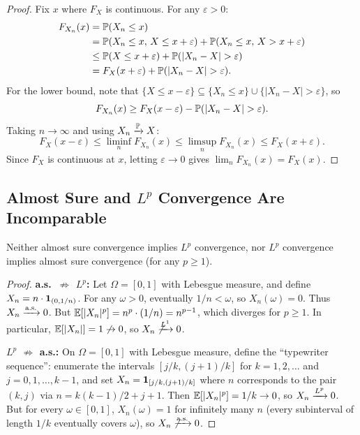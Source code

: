\documentclass[11pt,a4paper]{article}
\begin{document}
\begin{proof}
Fix $x$ where $F_X$ is continuous.  For any $\varepsilon > 0$:
\begin{align}
  F_{X_n}(x) &= \mathbb{P}(X_n \leq x) \nonumber\\
  &= \mathbb{P}(X_n \leq x,\, X \leq x + \varepsilon)
    + \mathbb{P}(X_n \leq x,\, X > x + \varepsilon) \nonumber\\
  &\leq \mathbb{P}(X \leq x + \varepsilon)
    + \mathbb{P}(|X_n - X| > \varepsilon) \nonumber\\
  &= F_X(x + \varepsilon) + \mathbb{P}(|X_n - X| > \varepsilon).
  \label{eq:prob_to_dist_upper}
\end{align}
For the lower bound, note that $\{X \leq x - \varepsilon\}
\subseteq \{X_n \leq x\} \cup \{|X_n - X| > \varepsilon\}$, so
\begin{equation}
  F_{X_n}(x) \geq F_X(x - \varepsilon)
    - \mathbb{P}(|X_n - X| > \varepsilon).
  \label{eq:prob_to_dist_lower}
\end{equation}
Taking $n \to \infty$ and using $X_n \xrightarrow{\mathbb{P}} X$:
\begin{equation}
  F_X(x - \varepsilon)
  \leq \liminf_n F_{X_n}(x)
  \leq \limsup_n F_{X_n}(x)
  \leq F_X(x + \varepsilon).
\end{equation}
Since $F_X$ is continuous at $x$, letting $\varepsilon \to 0$
gives $\lim_n F_{X_n}(x) = F_X(x)$.
\end{proof}

\subsection{Almost Sure and $L^p$ Convergence Are Incomparable}
\label{subsec:as_lp_incomparable}

\begin{theorem}
\label{thm:as_lp_no_implication}
Neither almost sure convergence implies $L^p$ convergence, nor
$L^p$ convergence implies almost sure convergence (for any
$p \geq 1$).
\end{theorem}

\begin{proof}
\textbf{a.s.\ $\not\Rightarrow$ $L^p$:}
Let $\Omega = [0,1]$ with Lebesgue measure, and define
$X_n = n \cdot \mathbf{1}_{(0, 1/n)}$.  For any $\omega > 0$,
eventually $1/n < \omega$, so $X_n(\omega) = 0$.  Thus
$X_n \xrightarrow{\text{a.s.}} 0$.  But $\mathbb{E}[|X_n|^p] = n^p \cdot (1/n) = n^{p-1}$,
which diverges for $p \geq 1$.  In particular,
$\mathbb{E}[|X_n|] = 1 \not\to 0$, so $X_n \not\xrightarrow{L^{1}} 0$.

\textbf{$L^p$ $\not\Rightarrow$ a.s.:}
On $\Omega = [0,1]$ with Lebesgue measure, define the
``typewriter sequence'': enumerate the intervals $[j/k, (j+1)/k]$
for $k = 1, 2, \ldots$ and $j = 0, 1, \ldots, k-1$, and set
$X_n = \mathbf{1}_{[j/k, (j+1)/k]}$ where $n$ corresponds to the
pair $(k, j)$ via $n = k(k-1)/2 + j + 1$.  Then
$\mathbb{E}[|X_n|^p] = 1/k \to 0$, so $X_n \xrightarrow{L^{p}} 0$.  But for every
$\omega \in [0,1]$, $X_n(\omega) = 1$ for infinitely many $n$
(every subinterval of length $1/k$ eventually covers $\omega$),
so $X_n \not\xrightarrow{\text{a.s.}} 0$.
\end{proof}
\end{document}

